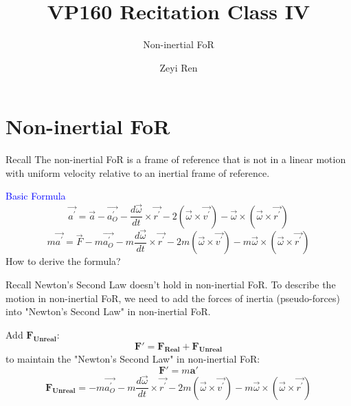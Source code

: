 \documentclass{beamer}
\title{VP160 Recitation Class IV}
\subtitle{Non-inertial FoR}
\author{Zeyi Ren}
\institute{UM-SJTU Joint Institute}
\begin{document}
\maketitle


\section{Non-inertial FoR}
\begin{frame}
  \begin{block}{Recall}
    The non-inertial FoR is a frame of reference that is not in a linear motion with uniform velocity relative to an inertial frame of reference.
  \end{block}
  \pause
  \textcolor{blue}{Basic Formula}
  $$
  \vec{a^{\prime}}=\vec{a}-\vec{a_{O}^{\prime}}-\frac{d \vec{\omega}}{d t} \times \vec{r^{\prime}}-2(\vec{\omega} \times \vec{v^{\prime}})-\vec{\omega} \times(\vec{\omega} \times \vec{r^{\prime}})
  $$
  \pause
  $$
  m \vec{a^{\prime}}=\vec{F}-m \vec{a_{O}^{\prime}}-m \frac{d \vec{\omega}}{d t} \times \vec{r^{\prime}}-2 m(\vec{\omega} \times \vec{v^{\prime}})-m \vec{\omega} \times(\vec{\omega} \times \vec{r^{\prime}})
  $$
  \pause
  How to derive the formula?
\end{frame}

\begin{frame}
  \begin{block}{Recall}
    Newton's Second Law doesn't hold in non-inertial FoR. To describe the motion in non-inertial FoR, we need to add the forces of inertia (pseudo-forces) into "Newton's Second Law" in non-inertial FoR.
  \end{block}
  \pause
  Add $\mathbf{F_{Unreal}}$:
  $$
  \mathbf{F'} = \mathbf{F_{Real}} + \mathbf{F_{Unreal}}
  $$
  \pause
  to maintain the "Newton's Second Law" in non-inertial FoR:
  $$
  \mathbf{F'} = m \mathbf{a'}
  $$
  \pause
  $$
  \mathbf{F_{Unreal}} = -m \vec{a_{O}^{\prime}}-m \frac{d \vec{\omega}}{d t} \times \vec{r^{\prime}}-2 m(\vec{\omega} \times \vec{v^{\prime}})-m \vec{\omega} \times(\vec{\omega} \times \vec{r^{\prime}})
  $$
\end{frame}
\end{document}
